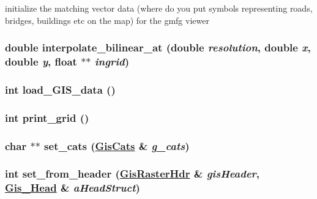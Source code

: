 initialize the matching vector data (where do you put symbols representing roads, bridges, buildings etc on the map) for the gmfg viewer 

\hypertarget{GisApi_8C_a67}{
\subsubsection[interpolate\_\-bilinear\_\-at]{\setlength{\rightskip}{0pt plus 5cm}double interpolate\_\-bilinear\_\-at (double {\em resolution}, double {\em x}, double {\em y}, float $\ast$$\ast$ {\em ingrid})}}
\label{GisApi_8C_a67}


\hypertarget{GisApi_8C_a7}{
\subsubsection[load\_\-GIS\_\-data]{\setlength{\rightskip}{0pt plus 5cm}int load\_\-GIS\_\-data ()}}
\label{GisApi_8C_a7}


\hypertarget{GisApi_8C_a20}{
\subsubsection[print\_\-grid]{\setlength{\rightskip}{0pt plus 5cm}int print\_\-grid ()}}
\label{GisApi_8C_a20}


\hypertarget{GisApi_8C_a19}{
\subsubsection[set\_\-cats]{\setlength{\rightskip}{0pt plus 5cm}char $\ast$$\ast$ set\_\-cats (\hyperlink{classGisCats}{Gis\-Cats} \& {\em g\_\-cats})}}
\label{GisApi_8C_a19}


\hypertarget{GisApi_8C_a8}{
\subsubsection[set\_\-from\_\-header]{\setlength{\rightskip}{0pt plus 5cm}int set\_\-from\_\-header (\hyperlink{classGisRasterHdr}{Gis\-Raster\-Hdr} \& {\em gis\-Header}, \hyperlink{structGis__Head}{Gis\_\-Head} \& {\em a\-Head\-Struct})}}
\label{GisApi_8C_a8}


